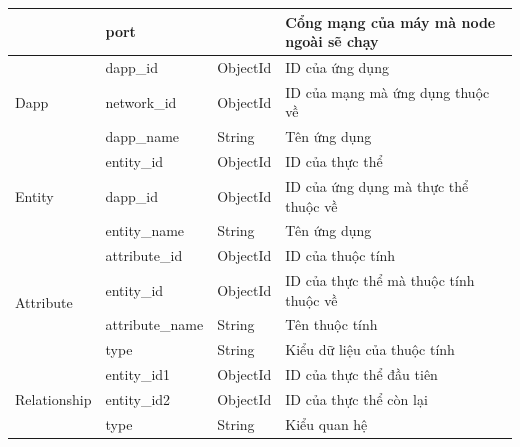 \documentclass[../DoAn.tex]{subfiles}
\begin{document}
\begin{longtable}{|p{}|p{}|p{}|p{}|}
                                                 & port               &              & Cổng mạng của máy mà node ngoài sẽ chạy  \\ \hline
    \multirow[t]{3}{0.2\textwidth}{Dapp}         & dapp\_id           & ObjectId     & ID của ứng dụng                          \\ \cline{2-4}
                                                 & network\_id        & ObjectId     & ID của mạng mà ứng dụng thuộc về         \\ \cline{2-4}
                                                 & dapp\_name         & String       & Tên ứng dụng                             \\ \hline
    \multirow[t]{3}{0.2\textwidth}{Entity}       & entity\_id         & ObjectId     & ID của thực thể                          \\ \cline{2-4}
                                                 & dapp\_id           & ObjectId     & ID của ứng dụng mà thực thể thuộc về     \\ \cline{2-4}
                                                 & entity\_name       & String       & Tên ứng dụng                             \\ \hline
    \multirow[t]{4}{0.2\textwidth}{Attribute}    & attribute\_id      & ObjectId     & ID của thuộc tính                        \\ \cline{2-4}
                                                 & entity\_id         & ObjectId     & ID của thực thể mà thuộc tính thuộc về   \\ \cline{2-4}
                                                 & attribute\_name    & String       & Tên thuộc tính                           \\ \cline{2-4}
                                                 & type               & String       & Kiểu dữ liệu của thuộc tính              \\ \hline
    \multirow[t]{3}{0.2\textwidth}{Relationship} & entity\_id1        & ObjectId     & ID của thực thể đầu tiên                 \\ \cline{2-4}
                                                 & entity\_id2        & ObjectId     & ID của thực thể còn lại                  \\ \cline{2-4}
                                                 & type               & String       & Kiểu quan hệ                             \\ \hline
\end{longtable}
\end{document}
